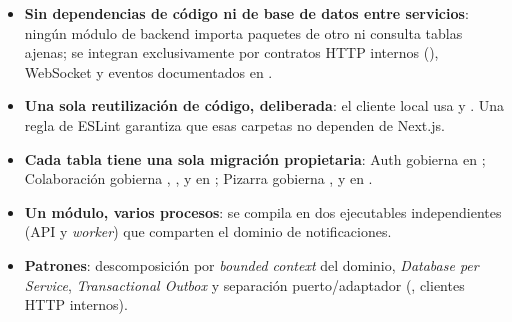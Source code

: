 \begin{itemize}
  \item \textbf{Sin dependencias de código ni de base de datos entre servicios}: ningún módulo de backend importa paquetes de otro ni consulta tablas ajenas; se integran exclusivamente por contratos HTTP internos (), WebSocket y eventos documentados en .
  \item \textbf{Una sola reutilización de código, deliberada}: el cliente local usa  y . Una regla de ESLint garantiza que esas carpetas no dependen de Next.js.
  \item \textbf{Cada tabla tiene una sola migración propietaria}: Auth gobierna  en ; Colaboración gobierna , ,  y  en ; Pizarra gobierna ,  y  en .
  \item \textbf{Un módulo, varios procesos}:  se compila en dos ejecutables independientes (API y \textit{worker}) que comparten el dominio de notificaciones.
  \item \textbf{Patrones}: descomposición por \emph{bounded context} del dominio, \emph{Database per Service}, \emph{Transactional Outbox} y separación puerto/adaptador (, clientes HTTP internos).
\end{itemize}
